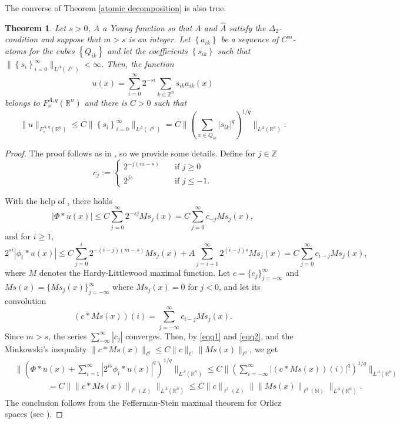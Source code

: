 \documentclass[leqno,twoside, 12pt]{amsart}
\theoremstyle{plain}
\numberwithin{equation}{section} \numberwithin{figure}{section}
\newtheorem{theorem}{Theorem}[section]
\theoremstyle{definition}
\newcommand{\R}{\mathbb R}
\numberwithin{equation}{section}
\begin{document}
The converse of Theorem \ref{atomic decomposition} is also true.
\begin{theorem} \label{atomic decomposition.2}
Let $s>0$, $A$ a Young function so that $A$ and $\hat A$ satisfy the $\Delta_2$-condition and suppose that $m>s$ is an integer. Let $\left\lbrace a_{ik}\right\rbrace$ be a sequence of $C^m$-atoms for the cubes $\left\lbrace Q_{ik} \right\rbrace$ and let the coefficients $\left\lbrace s_{ik}\right\rbrace$ such that $\|\left\lbrace s_i\right\rbrace_{i=0}^\infty\|_{L^A(\ell^q)}<\infty$. Then, the function
$$u(x)=\sum_{i=0}^\infty 2^{-si}\sum_{k\in \mathbb{Z}^n}s_{ik}a_{ik}(x)$$belongs to $F_s^{A, q}(\R^n)$ and there is $C>0$ such that
\begin{equation}
\|u\|_{F_s^{A, q}(\R^n)} \leq C\|\left\lbrace s_i\right\rbrace_{i=0}^\infty\|_{L^A(\ell^q)}=C\bigg\| \left( \sum_{x\in Q_{ik}}|s_{ik}|^q\right)^{1/q}\bigg\|_{L^A(\R^n)}.
\end{equation}
\end{theorem}
\begin{proof}
The proof follows as in \cite[Theorem 4.6.3]{AH}, so we provide some details. Define for $j\in \mathbb{Z}$
$$c_j:=\begin{cases} 2^{-j(m-s)} \quad & \text{if }j\geq 0\\
2^{js} \quad & \text{if } j\leq -1.
\end{cases}$$

 With the help of \cite[Lemma 4.6.4 and Lemma 4.6.5]{AH}, there holds
\begin{equation}\label{eqq1}
|\Phi* u(x)|\leq C\sum_{j=0}^\infty 2^{-sj}Ms_j(x)= C\sum_{j=0}^\infty c_{-j}Ms_j(x),
\end{equation}and for $i\geq 1$,
\begin{equation}\label{eqq2}
2^{si}|\phi_i*u(x)|\leq C\sum_{j=0}^i2^{-(i-j)(m-s)}Ms_j(x)+A\sum_{j=i+1}^\infty 2^{(i-j)s}Ms_j(x)= C\sum_{j=0}^\infty c_{i-j}Ms_j(x),
\end{equation}where $M$ denotes the Hardy-Littlewood maximal function. Let $c=\{c_j\}_{j=-\infty}^\infty$ and $Ms(x)=\{Ms_j(x)\}_{j=-\infty}^\infty$ where $Ms_j(x)=0$ for $j<0$, and let its convolution
$$(c*Ms(x))(i)= \sum_{j=-\infty}^\infty c_{i-j}Ms_j(x).$$Since $m>s$, the series $\sum_{-\infty}^\infty|c_j|$ converges. Then, by \eqref{eqq1} and \eqref{eqq2},  and the Minkowski's inequality $\|c*Ms(x)\|_{\ell^q}\leq C\|c\|_{\ell^1}\|Ms(x)\|_{\ell^q}$, we get
\begin{equation*}
\begin{split}
&\bigg\|\left(\Phi*u(x)+\sum_{i=1}^\infty| 2^{is}\phi_i*u(x)|^q \right)^{1/q}\bigg\|_{L^A(\R^n)} \leq C\bigg\|\left(\sum_{i=-\infty}^\infty |(c*Ms(x))(i)|^q \right)^{1/q}\bigg\|_{L^A(\R^n)}\\ & \qquad\qquad = C\bigg\|\|c*Ms(x)\|_{\ell^q(\mathbb{Z})}\bigg\|_{L^A(\R^n)} \leq C\|c\|_{\ell^1(\mathbb{Z})}\|\|Ms(x)\|_{\ell^q(\mathbb{N})}\|_{L^A(\R^n)}.
\end{split}
\end{equation*}The conclusion follows from the Fefferman-Stein maximal theorem for Orlicz spaces (see \cite[Corollary 5.4.1]{HH}).
\end{proof}
\end{document}
